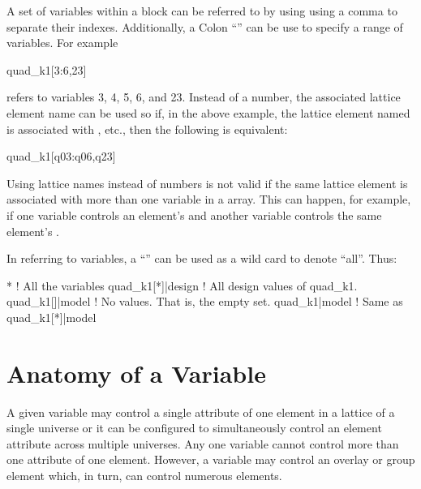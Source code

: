 A set of variables within a  block can be referred to by using using a comma \vn{,} to
separate their indexes. Additionally, a Colon ``\vn{:}'' can be use to specify a range of
variables. For example
\begin{example}
  quad_k1[3:6,23]
\end{example}
refers to variables 3, 4, 5, 6, and 23. Instead of a number, the associated lattice element name can
be used so if, in the above example, the lattice element named  is associated with
, etc., then the following is equivalent:
\begin{example}
  quad_k1[q03:q06,q23]
\end{example}
Using lattice names instead of numbers is not valid if the same lattice element is associated with
more than one variable in a  array. This can happen, for example, if one variable
controls an element's  and another variable controls the same element's .

In referring to variables, a ``\vn{*}'' can be used as a wild card to 
denote ``all''. Thus:
\begin{example}
  *                 ! All the variables
  quad_k1[*]|design ! All design values of quad_k1.
  quad_k1[]|model   ! No values. That is, the empty set.
  quad_k1|model     ! Same as quad_k1[*]|model
\end{example}

\section{Anatomy of a Variable}
\label{s:var.anatomy}

A given variable may control a single attribute of one element in a  lattice of a single
universe or it can be configured to simultaneously control an element attribute across multiple
universes. Any one variable cannot control more than one attribute of one element. However, a
variable may control an overlay or group element which, in turn, can control numerous elements.

